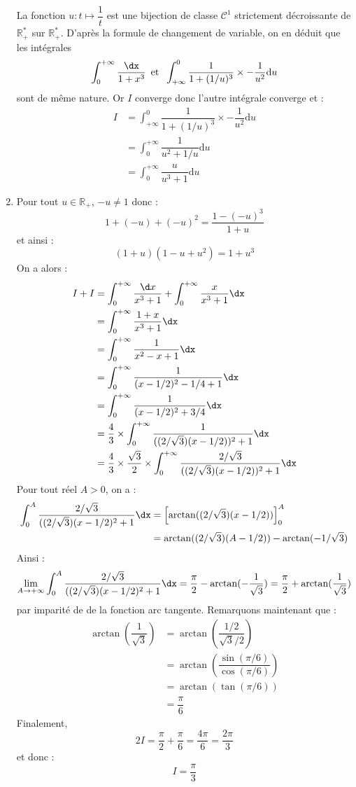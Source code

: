 \documentclass[a4paper,10pt]{report}
\begin{document}
\begin{enumerate}
\noindent La fonction $u : t \mapsto \dfrac{1}{t}$ est une bijection de classe $\mathcal{C}^1$ strictement décroissante de $\mathbb{R}_+^*$ sur $\mathbb{R}_+^*$. D'après la formule de changement de variable, on en déduit que les intégrales 
$$ \int_0^{+\infty} \dfrac{\dx}{1+x^3} \,\hbox{ et } \;\int_{+\infty}^{0} \dfrac{1}{1+(1/u)^3} \times - \dfrac{1}{u^2} \textrm{d}u$$
sont de même nature. Or $I$ converge donc l'autre intégrale converge et :
\begin{align*}
I & = \int_{+\infty}^{0} \dfrac{1}{1+(1/u)^3} \times - \dfrac{1}{u^2} \textrm{d}u  \\
& = \int_{0}^{+ \infty} \dfrac{1}{u^2+1/u} \textrm{d}u \\
& = \int_{0}^{+ \infty} \dfrac{u}{u^3+1} \textrm{d}u 
\end{align*}
\item Pour tout $u \in \mathbb{R}_+$, $-u \neq 1$ donc :
$$ 1+ (-u)+ (-u)^2 = \dfrac{1-(-u)^3}{1+u}$$
et ainsi :
$$ (1+u)(1-u+u^2) = 1+u^3$$
On a alors :
\begin{align*}
I+I & = \int_{0}^{ + \infty} \frac{\d x}{x^{3} + 1} + \int_{0}^{ + \infty} \frac{x}{x^{3} + 1}\dx\\
& = \int_{0}^{ + \infty} \frac{1+x}{x^{3} + 1} \dx \\
& = \int_{0}^{ + \infty} \frac{1}{x^2-x+1} \dx \\
& = \int_{0}^{ + \infty} \frac{1}{(x-1/2)^2-1/4+1} \dx \\
& = \int_{0}^{ + \infty} \frac{1}{(x-1/2)^2+3/4} \dx \\
& = \dfrac{4}{3} \times  \int_{0}^{ + \infty} \frac{1}{((2/ \sqrt{3})(x-1/2))^2+1} \dx \\
& = \dfrac{4}{3} \times \dfrac{\sqrt{3}}{2} \times \int_{0}^{ + \infty} \frac{2/\sqrt{3}}{((2/ \sqrt{3})(x-1/2))^2+1} \dx 
\end{align*}
Pour tout réel $A >0$, on a :
\begin{align*}
\int_{0}^{A} \frac{2/\sqrt{3}}{((2/ \sqrt{3})(x-1/2)^2+1} \dx & = \left[ \arctan((2/ \sqrt{3})(x-1/2)) \right]_0^A \\
& = \arctan((2/ \sqrt{3})(A-1/2)) - \arctan(- 1/\sqrt{3})
\end{align*}
Ainsi :
$$ \lim_{A \rightarrow + \infty} \int_{0}^{A} \frac{2/\sqrt{3}}{((2/ \sqrt{3})(x-1/2)^2+1} \dx = \dfrac{\pi}{2} - \arctan(- \dfrac{1}{\sqrt{3}}) = \dfrac{\pi}{2} + \arctan(\dfrac{1}{\sqrt{3}})$$
par imparité de de la fonction arc tangente. Remarquons maintenant que :
\begin{align*}
\arctan \left(\dfrac{1}{\sqrt{3}}\right) & = \arctan\left(\dfrac{1/2}{\sqrt{3}/2}\right) \\
& =  \arctan \left(\dfrac{\sin(\pi/6)}{\cos(\pi/6)}\right) \\
& = \arctan\left(\tan(\pi/6)\right) \\
& = \dfrac{\pi}{6}
\end{align*}
Finalement,
$$ 2I = \dfrac{\pi}{2} + \dfrac{\pi}{6} = \dfrac{4\pi}{6} = \dfrac{2\pi}{3}$$
et donc :
$$ I = \dfrac{\pi}{3}$$

\end{enumerate} 
\end{document}
